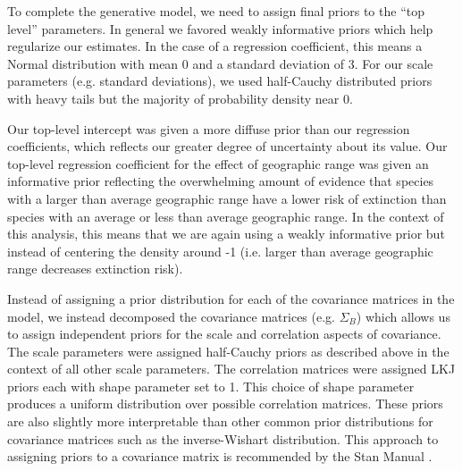 \documentclass[12pt,letterpaper]{article}
\begin{document}
To complete the generative model, we need to assign final priors to the ``top level'' parameters. In general we favored weakly informative priors which help regularize our estimates. In the case of a regression coefficient, this means a Normal distribution with mean 0 and a standard deviation of 3. For our scale parameters (e.g. standard deviations), we used half-Cauchy distributed priors with heavy tails but the majority of probability density near 0.

Our top-level intercept was given a more diffuse prior than our regression coefficients, which reflects our greater degree of uncertainty about its value. Our top-level regression coefficient for the effect of geographic range was given an informative prior reflecting the overwhelming amount of evidence that species with a larger than average geographic range have a lower risk of extinction than species with an average or less than average geographic range. In the context of this analysis, this means that we are again using a weakly informative prior but instead of centering the density around -1 (i.e. larger than average geographic range decreases extinction risk).

Instead of assigning a prior distribution for each of the covariance matrices in the model, we instead decomposed the covariance matrices (e.g. \(\Sigma_{B}\)) which allows us to assign independent priors for the scale and correlation aspects of covariance. The scale parameters were assigned half-Cauchy priors as described above in the context of all other scale parameters. The correlation matrices were assigned LKJ priors each with shape parameter set to 1. This choice of shape parameter produces a uniform distribution over possible correlation matrices. These priors are also slightly more interpretable than other common prior distributions for covariance matrices such as the inverse-Wishart distribution. This approach to assigning priors to a covariance matrix is recommended by the Stan Manual \citep{StanManual}.
\end{document}
